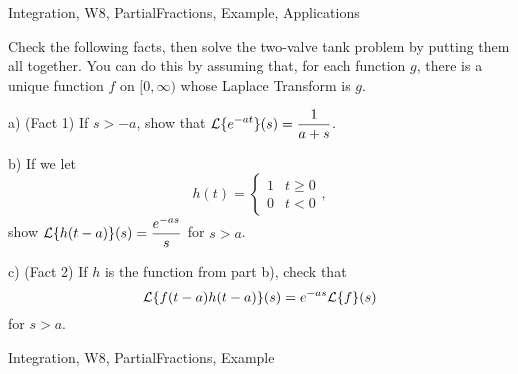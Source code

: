 \begin{tagblock}{Integration, W8, PartialFractions, Example, Applications}
\begin{question}
Check the following facts, then solve the two-valve tank problem by putting them all together. You can do this by assuming that, for each function $g$, there is a unique function $f$ on $[0,\infty)$ whose Laplace Transform is $g$. 

\bigskip

a) (Fact 1) If $s>-a$, show that $\displaystyle\mathcal{L}\{e^{-at}\}(s)=\frac 1 {a+s}$. 

\bigskip

b) If we let
\[
h(t)=\begin{cases} 1 & t\geq 0 \\ 0 & t<0\end{cases},
\]
show $\displaystyle\mathcal{L}\{h(t-a)\}(s)=\frac {e^{-as}} s$ for $s>a$. 

\bigskip

c) (Fact 2) If $h$ is the function from part b), check that 
\[
\mathcal{L}\{f(t-a)h(t-a)\}(s)=e^{-as}\mathcal{L}\{f\}(s)
\]
for $s>a$. 

\bigskip
	
	
\begin{tags}
	   Integration, W8, PartialFractions, Example
\end{tags}
	
\begin{diary}
	   
\end{diary}
	
\begin{solution}
	   
	    \end{enumerate}
\end{solution}
	
\end{question}

\end{tagblock}

